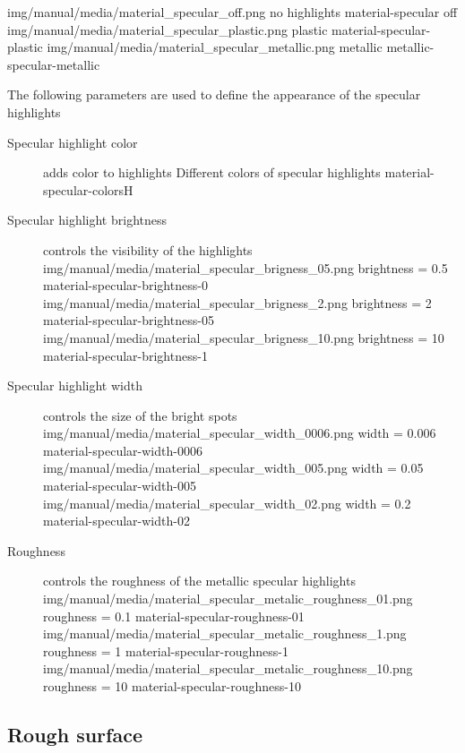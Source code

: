 \threeImagesWithTwoCaptionsFullWidth
{img/manual/media/material_specular_off.png}
{no highlights}
{material-specular off}
{img/manual/media/material_specular_plastic.png}
{plastic}
{material-specular-plastic}
{img/manual/media/material_specular_metallic.png}
{metallic}
{metallic-specular-metallic}

The following parameters are used to define the appearance of the specular highlights
\begin{description}
	\item[Specular highlight color] adds color to highlights
	{Different colors of specular highlights}
	{material-specular-colors}{H}

	\item[Specular highlight brightness] controls the visibility of the highlights
	\threeImagesWithTwoCaptionsFullWidth
	{img/manual/media/material_specular_brigness_05.png}
	{brightness = 0.5}
	{material-specular-brightness-0}
	{img/manual/media/material_specular_brigness_2.png}
	{brightness = 2}
	{material-specular-brightness-05}
	{img/manual/media/material_specular_brigness_10.png}
	{brightness = 10}
	{material-specular-brightness-1}
	
	\item[Specular highlight width] controls the size of the bright spots
	\threeImagesWithTwoCaptionsFullWidth
	{img/manual/media/material_specular_width_0006.png}
	{width = 0.006}
	{material-specular-width-0006}
	{img/manual/media/material_specular_width_005.png}
	{width = 0.05}
	{material-specular-width-005}
	{img/manual/media/material_specular_width_02.png}
	{width = 0.2}
	{material-specular-width-02}
	
	\item[Roughness] controls the roughness of the metallic specular highlights
	\threeImagesWithTwoCaptionsFullWidth
	{img/manual/media/material_specular_metalic_roughness_01.png}
	{roughness = 0.1}
	{material-specular-roughness-01}
	{img/manual/media/material_specular_metalic_roughness_1.png}
	{roughness = 1}
	{material-specular-roughness-1}
	{img/manual/media/material_specular_metalic_roughness_10.png}
	{roughness = 10}
	{material-specular-roughness-10}
		
\end{description}

\subsection{Rough surface}\label{materials-roughness}

